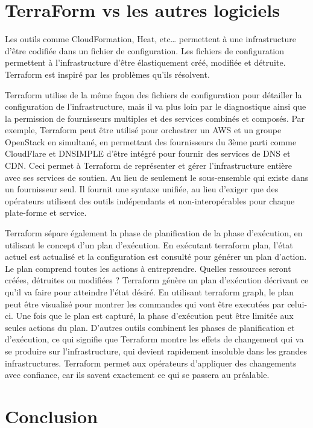 \documentclass[]{article}
\begin{document}
\section{TerraForm vs les autres
logiciels}\label{terraform-vs-les-autres-logiciels}

Les outils comme CloudFormation, Heat, etc\ldots{} permettent à une
infrastructure d'être codifiée dans un fichier de configuration. Les
fichiers de configuration permettent à l'infrastructure d'être
élastiquement créé, modifiée et détruite. Terraform est inspiré par les
problèmes qu'ils résolvent.

Terraform utilise de la même façon des fichiers de configuration pour
détailler la configuration de l'infrastructure, mais il va plus loin par
le diagnostique ainsi que la permission de fournisseurs multiples et des
services combinés et composés. Par exemple, Terraform peut être utilisé
pour orchestrer un AWS et un groupe OpenStack en simultané, en
permettant des fournisseurs du 3ème parti comme CloudFlare et DNSIMPLE
d'être intégré pour fournir des services de DNS et CDN. Ceci permet à
Terraform de représenter et gérer l'infrastructure entière avec ses
services de soutien. Au lieu de seulement le sous-ensemble qui existe
dans un fournisseur seul. Il fournit une syntaxe unifiée, au lieu
d'exiger que des opérateurs utilisent des outils indépendants et
non-interopérables pour chaque plate-forme et service.

Terraform sépare également la phase de planification de la phase
d'exécution, en utilisant le concept d'un plan d'exécution. En exécutant
terraform plan, l'état actuel est actualisé et la configuration est
consulté pour générer un plan d'action. Le plan comprend toutes les
actions à entreprendre. Quelles ressources seront créées, détruites ou
modifiées ? Terraform génère un plan d'exécution décrivant ce qu'il va
faire pour atteindre l'état désiré. En utilisant terraform graph, le
plan peut être visualisé pour montrer les commandes qui vont être
executées par celui-ci. Une fois que le plan est capturé, la phase
d'exécution peut être limitée aux seules actions du plan. D'autres
outils combinent les phases de planification et d'exécution, ce qui
signifie que Terraform montre les effets de changement qui va se
produire sur l'infrastructure, qui devient rapidement insoluble dans les
grandes infrastructures. Terraform permet aux opérateurs d'appliquer des
changements avec confiance, car ils savent exactement ce qui se passera
au préalable.

\newpage
\section{Conclusion}\label{conclusion}
\end{document}
